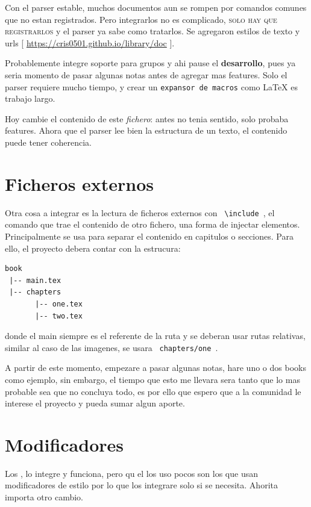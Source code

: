 \documentclass{article}
\begin{document}
  Con el parser estable, muchos documentos aun se rompen por comandos comunes
  que no estan registrados. Pero integrarlos no es complicado, \textsc{solo hay
  que registrarlos} y el parser ya sabe como tratarlos. Se agregaron estilos de
  texto y urls [ \url{https://cris0501.github.io/library/doc} ].

  Probablemente integre soporte para grupos y ahi pause el \textbf{desarrollo},
  pues ya seria momento de pasar algunas notas antes de agregar mas features.
  Solo el parser requiere mucho tiempo, y crear un \texttt{expansor de macros}
  como LaTeX es trabajo largo.

  Hoy cambie el contenido de este \textit{fichero}: antes no tenia sentido,
  solo probaba features. Ahora que el parser lee bien la estructura de un texto,
  el contenido puede tener coherencia.

  \section{ Ficheros externos }
  
  Otra cosa a integrar es la lectura de ficheros externos con \texttt{ \backslash include },
  el comando que trae el contenido de otro fichero, una forma
  de injectar elementos. Principalmente se usa para separar el contenido en capitulos
  o secciones. Para ello, el proyecto debera contar con la estrucura:
  
\begin{verbatim}
book
 |-- main.tex
 |-- chapters
       |-- one.tex
       |-- two.tex
\end{verbatim}

  donde el main siempre es el referente de la ruta y se deberan usar rutas relativas,
  similar al caso de las imagenes, se usara \texttt{ chapters/one }.

  A partir de este momento, empezare a pasar algunas notas, hare uno o dos books como
  ejemplo, sin embargo, el tiempo que esto me llevara sera tanto que lo mas
  probable sea que no concluya todo, es por ello que espero que a la comunidad
  le interese el proyecto y pueda sumar algun aporte.

  \section{Modificadores}
  
  Los , lo
  integre y funciona, pero qu el los uso pocos son los que usan modificadores
  de estilo por lo que los integrare solo si se necesita. Ahorita importa otro cambio.
  
\end{document}
